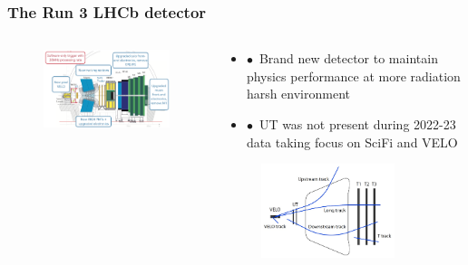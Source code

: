 \documentclass[aspectratio=1610, 12pt, xcolor=dvipsnames]{beamer}
\begin{document}
\begin{frame}\frametitle{The Run 3 LHCb detector}
  \begin{columns}
    \begin{column}[c]{0.6\textwidth}
      \begin{figure}
        \includegraphics[width=\textwidth]{plots/lhcb_upgrade.png}
      \end{figure}
    \end{column}
    \begin{column}{0.48\textwidth}
      \begin{itemize}
        \item $\bullet$\, Brand new detector to maintain physics performance at more radiation harsh environment
        \item $\bullet$\, UT was not present during 2022-23 data taking \to focus on SciFi and VELO
      \end{itemize}
      \begin{figure}
        \centering
        \includegraphics[width=0.8\textwidth]{track.png}
      \end{figure}
    \end{column}
  \end{columns}
\end{frame}
\end{document}
